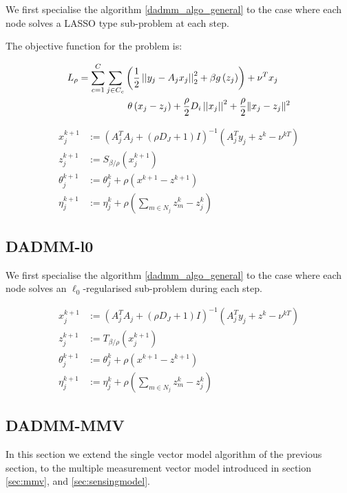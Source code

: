 We first specialise the algorithm \eqref{dadmm_algo_general} to the case where each node solves a LASSO type sub-problem at each step.

The objective function for the problem is:

\begin{align}
L_\rho = \sum_{c=1}^C\sum_{j \in C_c} &\left( \frac{1}{2}\left|\left|y_j - A_jx_j\right|\right|_2^2 + \beta g\left(z_j\right)\right) + \nu^Tx_j \nonumber \\
& \text{        } \theta\left(x_j - z_j\right) + \frac{\rho}{2}D_i\left|\left|x_j\right|\right|^2 + \frac{\rho }{2}\|x_j-z_j\|^2
\label{generic-iterations}
\end{align}

\begin{align}
x_j^{k+1} &:= \left(A_j^TA_j + (\rho D_J + 1) I\right)^{-1}\left(A_j^Ty_j +  z^k - \nu^{kT}\right)\\
z_j^{k+1} &:= S_{\beta/\rho}\left(x_j^{k+1} \right)
 \\
\theta_j^{k+1} &:= \theta_j^{k} + \rho \left(x^{k+1}-z^{k+1}\right) \\
\eta_j^{k+1} &:= \eta_j^k + \rho\left(\sum_{m \in N_j} z_m^k - z_j^k\right)
\label{dadmm_algo_lasso}
\end{align}

\subsection{DADMM-l0}

We first specialise the algorithm \eqref{dadmm_algo_general} to the case where each node solves an \(\ell_0\)-regularised sub-problem during each step.

\begin{align}
x_j^{k+1} &:= \left(A_j^TA_j + (\rho D_J + 1) I\right)^{-1}\left(A_j^Ty_j +  z^k - \nu^{kT}\right)\\
z_j^{k+1} &:= T_{\beta/\rho}\left(x_j^{k+1} \right)
 \\
\theta_j^{k+1} &:= \theta_j^{k} + \rho \left(x^{k+1}-z^{k+1}\right) \\
\eta_j^{k+1} &:= \eta_j^k + \rho\left(\sum_{m \in N_j} z_m^k - z_j^k\right)
\label{dadmm_algo_lasso}
\end{align}

\subsection{DADMM-MMV}
In this section we extend the single vector model algorithm of the previous section, to the multiple measurement vector model introduced in section \ref{sec:mmv}, and \ref{sec:sensingmodel}. 


